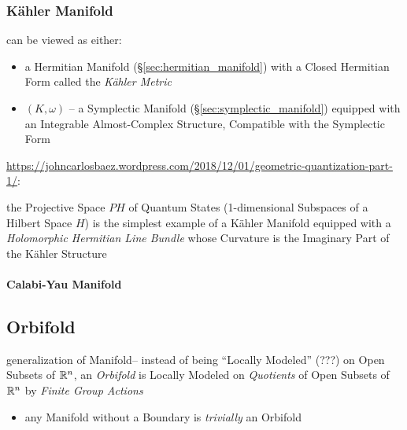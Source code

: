 


\subsubsection{K\"ahler Manifold}\label{sec:kahler_manifold}

can be viewed as either:

\begin{itemize}
\item a Hermitian Manifold (\S\ref{sec:hermitian_manifold}) with a
  Closed Hermitian Form called the \emph{K\"ahler Metric} %
\item $(K,\omega)$ -- a Symplectic Manifold
  (\S\ref{sec:symplectic_manifold}) equipped with an Integrable
  Almost-Complex Structure, Compatible with the Symplectic Form %
\end{itemize}

\url{https://johncarlosbaez.wordpress.com/2018/12/01/geometric-quantization-part-1/}:

the Projective Space $PH$ of Quantum States (1-dimensional Subspaces of a
Hilbert Space $H$) is the simplest example of a K\"ahler Manifold equipped with
a \emph{Holomorphic Hermitian Line Bundle} whose Curvature is the Imaginary Part
of the K\"ahler Structure



\paragraph{Calabi-Yau Manifold}\label{sec:calabi_yau_manifold}



\subsection{Orbifold}\label{sec:orbifold}

generalization of Manifold--
instead of being ``Locally Modeled'' (???) on Open Subsets of $\mathbb{R}^n$, an
\emph{Orbifold} is Locally Modeled on \emph{Quotients} of Open Subsets of
$\mathbb{R}^n$ by \emph{Finite Group Actions}

\begin{itemize}
  \item any Manifold without a Boundary is \emph{trivially} an Orbifold
\end{itemize}

